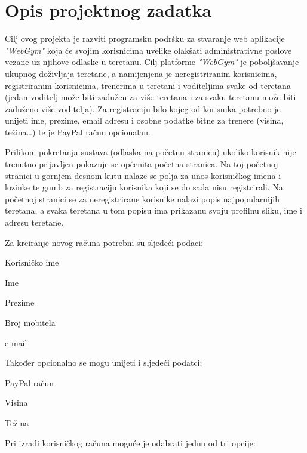 \chapter{Opis projektnog zadatka}
		
				
		Cilj ovog projekta je razviti programsku podršku za stvaranje web aplikacije
		\textit{"WebGym"} koja će svojim korisnicima uvelike olakšati administrativne 
		poslove vezane uz njihove odlaske u teretanu. Cilj platforme \textit{"WebGym"} 
		je poboljšavanje ukupnog doživljaja teretane, a namijenjena je neregistriranim 
		korisnicima, registriranim korisnicima, trenerima u teretani i voditeljima svake od 
		teretana (jedan voditelj može biti zadužen za više
		teretana i za svaku teretanu može biti zaduženo više voditelja). Za registraciju bilo kojeg od korisnika potrebno je unijeti
		ime, prezime, email adresu i osobne podatke bitne za trenere (visina, težina…) te je PayPal račun opcionalan. 
		
		Prilikom pokretanja sustava (odlaska na početnu stranicu) ukoliko korisnik nije trenutno prijavljen pokazuje se općenita početna stranica. Na toj početnoj stranici u gornjem desnom kutu nalaze se polja za unos korisničkog imena i lozinke te gumb za registraciju korisnika koji se do sada nisu registrirali. Na početnoj stranici se za neregistrirane korisnike nalazi popis najpopularnijih teretana, a svaka teretana u tom popisu ima prikazanu svoju profilnu sliku, ime i adresu teretane.
		
		Za kreiranje novog računa potrebni su sljedeći podaci:

		\begin{packed_item}
			\item Korisničko ime
			\item Ime
			\item Prezime
			\item Broj mobitela
			\item e-mail
		\end{packed_item}
	
		Također opcionalno se mogu unijeti i sljedeći podatci:
		
		\begin{packed_item}
			\item PayPal račun
			\item Visina
			\item Težina
		\end{packed_item}
	
		Pri izradi korisničkog računa moguće je odabrati jednu od tri opcije:
		
